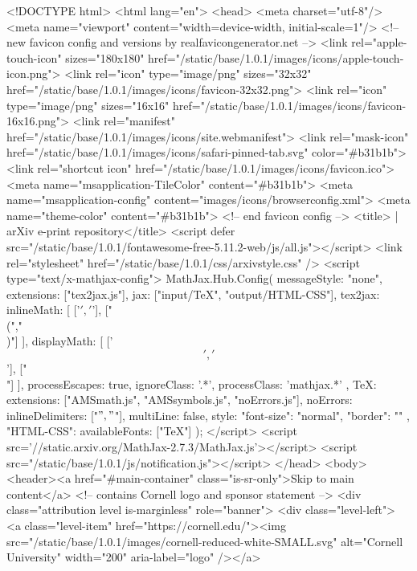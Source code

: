 <!DOCTYPE html>
<html lang="en">
  <head>
<meta charset="utf-8"/>
<meta name="viewport" content="width=device-width, initial-scale=1"/>
<!-- new favicon config and versions by realfavicongenerator.net -->
<link rel="apple-touch-icon" sizes="180x180" href="/static/base/1.0.1/images/icons/apple-touch-icon.png">
<link rel="icon" type="image/png" sizes="32x32" href="/static/base/1.0.1/images/icons/favicon-32x32.png">
<link rel="icon" type="image/png" sizes="16x16" href="/static/base/1.0.1/images/icons/favicon-16x16.png">
<link rel="manifest" href="/static/base/1.0.1/images/icons/site.webmanifest">
<link rel="mask-icon" href="/static/base/1.0.1/images/icons/safari-pinned-tab.svg" color="#b31b1b">
<link rel="shortcut icon" href="/static/base/1.0.1/images/icons/favicon.ico">
<meta name="msapplication-TileColor" content="#b31b1b">
<meta name="msapplication-config" content="images/icons/browserconfig.xml">
<meta name="theme-color" content="#b31b1b">
<!-- end favicon config -->
<title> | arXiv e-print repository</title>
<script defer src="/static/base/1.0.1/fontawesome-free-5.11.2-web/js/all.js"></script>
<link rel="stylesheet" href="/static/base/1.0.1/css/arxivstyle.css" />
<script type="text/x-mathjax-config">
  MathJax.Hub.Config({
    messageStyle: "none",
    extensions: ["tex2jax.js"],
    jax: ["input/TeX", "output/HTML-CSS"],
    tex2jax: {
      inlineMath: [ ['$','$'], ["\\(","\\)"] ],
      displayMath: [ ['$$','$$'], ["\\[","\\]"] ],
      processEscapes: true,
      ignoreClass: '.*',
      processClass: 'mathjax.*'
    },
    TeX: {
        extensions: ["AMSmath.js", "AMSsymbols.js", "noErrors.js"],
        noErrors: {
          inlineDelimiters: ["$","$"],
          multiLine: false,
          style: {
            "font-size": "normal",
            "border": ""
          }
        }
    },
    "HTML-CSS": { availableFonts: ["TeX"] }
  });
</script>
<script src='//static.arxiv.org/MathJax-2.7.3/MathJax.js'></script>
<script src="/static/base/1.0.1/js/notification.js"></script>
  </head>
  <body>
  <header><a href="#main-container" class="is-sr-only">Skip to main content</a>
<!-- contains Cornell logo and sponsor statement -->
<div class="attribution level is-marginless" role="banner">
  <div class="level-left">
    <a class="level-item" href="https://cornell.edu/"><img src="/static/base/1.0.1/images/cornell-reduced-white-SMALL.svg" alt="Cornell University" width="200" aria-label="logo" /></a>
